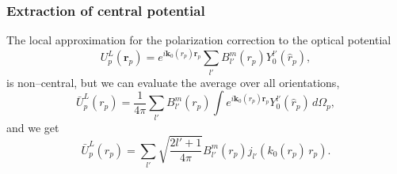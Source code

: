 \documentclass[a4paper,11pt]{article}
\begin{document}
  \subsubsection{Extraction of central potential}
The local approximation for the polarization correction to the optical potential 
 \begin{equation}\label{eq58}
U^L_p(\mathbf r_p)=e^{i\mathbf k_0(r_p)\mathbf r_p}\sum_{l'} B^m_{l'}(r_p)Y_0^{l'}(\hat r_p),
 \end{equation}
is non--central, but we can evaluate the average over all orientations,
 \begin{equation}\label{eq50}
\bar U^L_p(r_p)=\frac{1}{4\pi}\sum_{l'} B^m_{l'}(r_p)\int e^{i\mathbf k_0(r_p)\mathbf r_p}Y_0^{l'}(\hat r_p)\,d\Omega_p,
 \end{equation}
 and we get
 \begin{equation}\label{eq70}
 \bar U^L_p(r_p)=\sum_{l'}\sqrt{\frac{2l'+1}{4\pi}} B^m_{l'}(r_p)j_{l'}(k_0(r_p) \,r_p).
 \end{equation}
\end{document}

